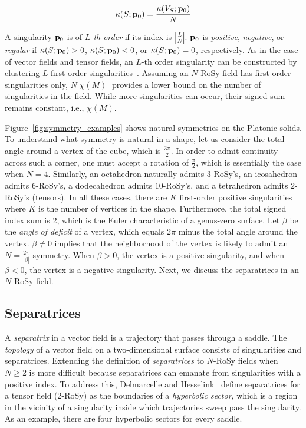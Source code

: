 \documentclass{acmsiggraph}               %
\begin{document}
\begin{equation}
\kappa(S; {\bf p}_0) = \frac{\kappa(V_S; {\bf p}_0)}{N}
\end{equation}

A singularity ${\bf p}_0$ is of {\em $L$-th order} if its index is
$|\frac{L}{N}|$. ${\bf p}_0$ is {\em positive}, {\em negative}, or
{\em regular} if $\kappa(S; {\bf p}_0) > 0$, $\kappa(S; {\bf p}_0) <
0$, or $\kappa(S; {\bf p}_0) =0$, respectively. As in the case of
vector fields and tensor fields, an $L$-th order singularity can be
constructed by clustering $L$ first-order
singularities~\cite{Scheuermann:98,Delmarcelle:94}. Assuming an
$N$-RoSy field has first-order singularities only, $N|\chi(M)|$
provides a lower bound on the number of singularities in the field.
While more singularities can occur, their signed sum remains
constant, i.e., $\chi(M)$.

Figure~\ref{fig:symmetry_examples} shows natural symmetries on the
Platonic solids. To understand what symmetry is natural in a shape,
let us consider the total angle around a vertex of the cube, which
is $\frac{3\pi}{2}$. In order to admit continuity across such a
corner, one must accept a rotation of $\frac{\pi}{2}$, which is
essentially the case when $N=4$. Similarly, an octahedron naturally
admits $3$-RoSy's, an icosahedron admits $6$-RoSy's, a dodecahedron
admits $10$-RoSy's, and a tetrahedron admits $2$-RoSy's (tensors).
In all these cases, there are $K$ first-order positive singularities
where $K$ is the number of vertices in the shape. Furthermore, the
total signed index sum is $2$, which is the Euler characteristic of
a genus-zero surface. Let $\beta$ be the {\em angle of deficit} of a
vertex, which equals $2\pi$ minus the total angle around the vertex.
$\beta \ne 0$ implies that the neighborhood of the vertex is likely
to admit an $N=\frac{2\pi}{|\beta|}$ symmetry. When $\beta > 0$, the
vertex is a positive singularity, and when $\beta < 0$, the vertex
is a negative singularity. Next, we discuss the separatrices in an
$N$-RoSy field.

\subsection{Separatrices}
\label{sec:separatrices}

A {\em separatrix} in a vector field is a trajectory that passes
through a saddle. The {\em topology} of a vector field on a
two-dimensional surface consists of singularities and separatrices.
Extending the definition of {\em separatrices} to $N$-RoSy fields
when $N \ge 2$ is more difficult because separatrices can emanate
from singularities with a positive index. To address this,
Delmarcelle and Hesselink~ define
separatrices for a tensor field ($2$-RoSy) as the boundaries of a
{\em hyperbolic sector}, which is a region in the vicinity of a
singularity inside which trajectories sweep pass the singularity. As
an example, there are four hyperbolic sectors for every saddle.
\end{document}
